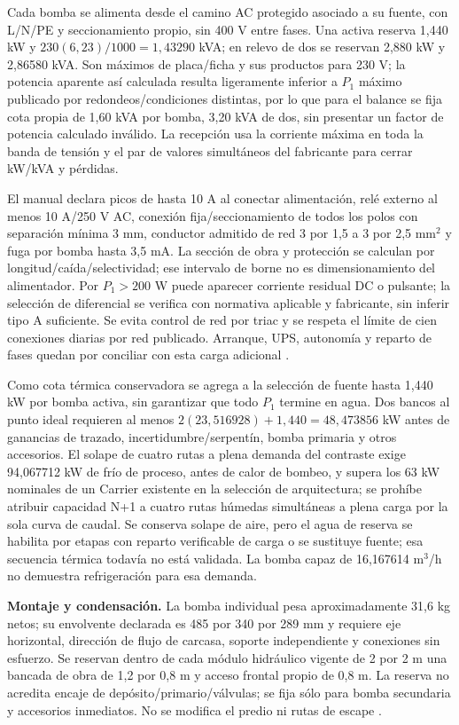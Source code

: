 Cada bomba se alimenta desde el camino AC protegido asociado a su fuente, con L/N/PE y seccionamiento propio, sin 400 V entre fases. Una activa reserva 1,440 kW y $230(6,23)/1000=1,43290$ kVA; en relevo de dos se reservan 2,880 kW y 2,86580 kVA. Son máximos de placa/ficha y sus productos para 230 V; la potencia aparente así calculada resulta ligeramente inferior a $P_1$ máximo publicado por redondeos/condiciones distintas, por lo que para el balance se fija cota propia de 1,60 kVA por bomba, 3,20 kVA de dos, sin presentar un factor de potencia calculado inválido. La recepción usa la corriente máxima en toda la banda de tensión y el par de valores simultáneos del fabricante para cerrar kW/kVA y pérdidas.

El manual declara picos de hasta 10 A al conectar alimentación, relé externo al menos 10 A/250 V AC, conexión fija/seccionamiento de todos los polos con separación mínima 3 mm, conductor admitido de red 3 por 1,5 a 3 por 2,5 mm$^2$ y fuga por bomba hasta 3,5 mA. La sección de obra y protección se calculan por longitud/caída/selectividad; ese intervalo de borne no es dimensionamiento del alimentador. Por $P_1>200$ W puede aparecer corriente residual DC o pulsante; la selección de diferencial se verifica con normativa aplicable y fabricante, sin inferir tipo A suficiente. Se evita control de red por triac y se respeta el límite de cien conexiones diarias por red publicado. Arranque, UPS, autonomía y reparto de fases quedan por conciliar con esta carga adicional \parencite[pp.~30--33]{lote37-wilo-instalacion}.

Como cota térmica conservadora se agrega a la selección de fuente hasta 1,440 kW por bomba activa, sin garantizar que todo $P_1$ termine en agua. Dos bancos al punto ideal requieren al menos $2(23,516928)+1,440=48,473856$ kW antes de ganancias de trazado, incertidumbre/serpentín, bomba primaria y otros accesorios. El solape de cuatro rutas a plena demanda del contraste exige 94,067712 kW de frío de proceso, antes de calor de bombeo, y supera los 63 kW nominales de un Carrier existente en la selección de arquitectura; se prohíbe atribuir capacidad N+1 a cuatro rutas húmedas simultáneas a plena carga por la sola curva de caudal. Se conserva solape de aire, pero el agua de reserva se habilita por etapas con reparto verificable de carga o se sustituye fuente; esa secuencia térmica todavía no está validada. La bomba capaz de 16,167614 m$^3$/h no demuestra refrigeración para esa demanda.

\textbf{Montaje y condensación.} La bomba individual pesa aproximadamente 31,6 kg netos; su envolvente declarada es 485 por 340 por 289 mm y requiere eje horizontal, dirección de flujo de carcasa, soporte independiente y conexiones sin esfuerzo. Se reservan dentro de cada módulo hidráulico vigente de 2 por 2 m una bancada de obra de 1,2 por 0,8 m y acceso frontal propio de 0,8 m. La reserva no acredita encaje de depósito/primario/válvulas; se fija sólo para bomba secundaria y accesorios inmediatos. No se modifica el predio ni rutas de escape \parencite{lote37-wilo-producto}\parencite[pp.~23--24]{lote37-wilo-instalacion}.

